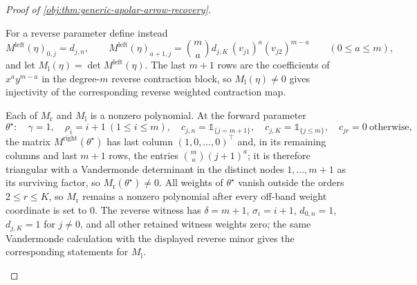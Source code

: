 \begin{proof}[Proof of \cref{obj:thm:generic-apolar-arrow-recovery}]
\begin{enumerate}
For a reverse parameter define instead
\[
M^{\mathrm{left}}(\eta)_{0,j}=d_{j,n},
\qquad
M^{\mathrm{left}}(\eta)_{a+1,j}=\binom{m}{a}d_{j,K}\,(v_{j1})^{a}(v_{j2})^{m-a}
\qquad(0\le a\le m),
\]
and let \(M_{\mathrm l}(\eta)=\det M^{\mathrm{left}}(\eta)\).  The last \(m+1\) rows are the coefficients of \(x^ay^{m-a}\) in the degree-\(m\) reverse contraction block, so \(M_{\mathrm l}(\eta)\ne0\) gives injectivity of the corresponding reverse weighted contraction map.

Each of \(M_{\mathrm r}\) and \(M_{\mathrm l}\) is a nonzero polynomial.  At the forward parameter
\[
\theta^\star:\quad \gamma=1,
\quad \rho_i=i+1\ (1\le i\le m),
\quad c_{j,n}=\mathbb 1_{\{j=m+1\}},
\quad c_{j,K}=\mathbb 1_{\{j\le m\}},
\quad c_{jr}=0\ \text{otherwise},
\]
the matrix \(M^{\mathrm{right}}(\theta^\star)\) has last column \((1,0,\ldots,0)^{\top}\) and, in its remaining columns and last \(m+1\) rows, the entries \(\binom{m}{a}(j+1)^{a}\); it is therefore triangular with a Vandermonde determinant in the distinct nodes \(1,\ldots,m+1\) as its surviving factor, so \(M_{\mathrm r}(\theta^\star)\ne0\).  All weights of \(\theta^\star\) vanish outside the orders \(2\le r\le K\), so \(M_{\mathrm r}\) remains a nonzero polynomial after every off-band weight coordinate is set to \(0\).  The reverse witness has \(\delta=m+1\), \(\sigma_i=i+1\), \(d_{0,n}=1\), \(d_{j,K}=1\) for \(j\ne0\), and all other retained witness weights zero; the same Vandermonde calculation with the displayed reverse minor gives the corresponding statements for \(M_{\mathrm l}\).


\end{enumerate}
\end{proof}
